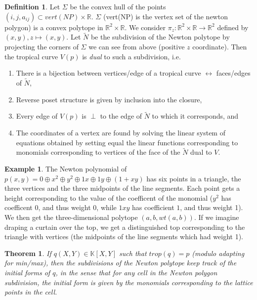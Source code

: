 \documentclass[12pt]{memoir}
\newtheorem{prototheorem}{Theorem}[section]
\newenvironment{theorem}
   {\begin{prototheorem}}
   {\end{prototheorem}}
\theoremstyle{definition}
\newtheorem{protoexample}{Example}[section]
\newenvironment{ex}
   {\begin{protoexample}}
   {\end{protoexample}}
\newtheorem{protodefinition}{Definition}[section]
\newenvironment{define}
   {\begin{protodefinition}}
   {\end{protodefinition}}
\def\RR{{\mathbb R}}
\def\KK{{\mathbb K}}
\begin{document}
\begin{define}
Let $\Sigma$ be the convex hull of the points $(i,j,a_{ij})\subset vert(NP)\times \RR$. $\Sigma$ (vert(NP) is the vertex set of the newton polygon) is a convex polytope in $\RR^2 \times \RR$. We consider $\pi_z: \RR^2 \times \RR \rightarrow \RR^2$ defined by $(x,y), z \mapsto (x,y)$. Let $\tilde{N}$ be the subdivision of the Newton polytope by projecting the corners of $\Sigma$ we can see from above (positive $z$ coordinate). Then the tropical curve $V(p)$ is \emph{dual} to such a subdivision, i.e.

\begin{enumerate}
    \item There is a bijection between vertices/edge of a tropical curve $\leftrightarrow$ faces/edges of $\tilde{N}$,
    \item Reverse poset structure is given by inclusion into the closure,
    \item Every edge of $V(p)$ is $\perp$ to the edge of $\tilde{N}$ to which it corresponds, and
    \item The coordinates of a vertex are found by solving the linear system of equations obtained by setting equal the linear functions corresponding to monomials corresponding to vertices of the face of the $\tilde{N}$ dual to $V$.
\end{enumerate}

\end{define}


\begin{ex}
  The Newton polynomial of $p(x,y) = 0 \oplus x^2 \oplus y^2 \oplus 1x \oplus 1y \oplus (1+xy)$ has six points in a triangle, the three vertices and the three midpoints of the line segments. Each point gets a height corresponding to the value of the coefficent of the monomial ($y^2$ has coefficent 0, and thus weight 0, while $1xy$ has coefficient $1$, and thus weight 1). We then get the three-dimensional polytope $(a,b, wt(a,b))$. If we imagine draping  a curtain over the top, we get a distinguished top corresponding to the triangle with vertices (the midpoints of the line segments which had weight 1).
\end{ex}

\begin{theorem}
    If $q(X,Y)\in \KK[X,Y]$ such that $trop(q) = p $ (modulo adapting for min/max), then the subdivisions of the Newton polytope keep track of the initial forms of $q$, in the sense that for any cell in the Newton polygon subdivision, the initial form is given by the monomials corresponding to the lattice points in the cell.
\end{theorem}
\end{document}
